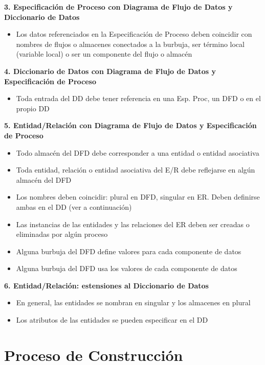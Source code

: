 \textbf{3. Especificación de Proceso con Diagrama de Flujo de Datos y Diccionario de Datos}

\begin{itemize}[noitemsep]
\item Los datos referenciados en la Especificación de Proceso deben coincidir con nombres de flujos o almacenes conectados a la burbuja, ser término local (variable local) o ser un componente del flujo o almacén
\end{itemize}

\textbf{4. Diccionario de Datos con Diagrama de Flujo de Datos y Especificación de Proceso}

\begin{itemize}[noitemsep]
\item Toda entrada del DD debe tener referencia en una Esp. Proc, un DFD o en el propio DD
\end{itemize}

\textbf{5. Entidad/Relación con Diagrama de Flujo de Datos y Especificación de Proceso}

\begin{itemize}[noitemsep]
\item Todo almacén del DFD debe corresponder a una entidad o entidad asociativa
\item Toda entidad, relación o entidad asociativa del E/R debe reflejarse en algún almacén del DFD
\item Los nombres deben coincidir: plural en DFD, singular en ER. Deben definirse ambas en el DD (ver a continuación)
\item Las instancias de las entidades y las relaciones del ER deben ser creadas o eliminadas por algún proceso
\item Alguna burbuja del DFD define valores para cada componente de datos
\item Alguna burbuja del DFD usa los valores de cada componente de datos
\end{itemize}

\textbf{6. Entidad/Relación: estensiones al Diccionario de Datos}

\begin{itemize}[noitemsep]
\item En general, las entidades se nombran en singular y los almacenes en plural
\item Los atributos de las entidades se pueden especificar en el DD
\end{itemize}

\section{Proceso de Construcción}


